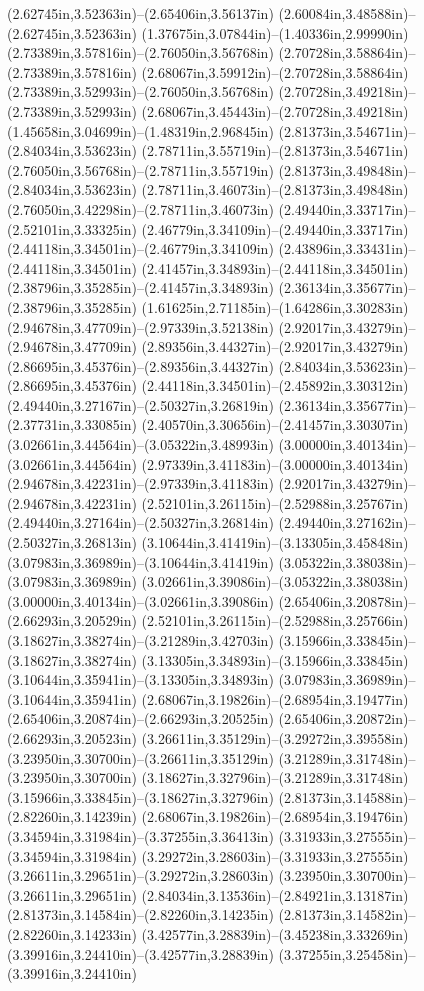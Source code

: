 (2.62745in,3.52363in)--(2.65406in,3.56137in) (2.60084in,3.48588in)--(2.62745in,3.52363in) (1.37675in,3.07844in)--(1.40336in,2.99990in) (2.73389in,3.57816in)--(2.76050in,3.56768in) (2.70728in,3.58864in)--(2.73389in,3.57816in) (2.68067in,3.59912in)--(2.70728in,3.58864in) (2.73389in,3.52993in)--(2.76050in,3.56768in) (2.70728in,3.49218in)--(2.73389in,3.52993in) (2.68067in,3.45443in)--(2.70728in,3.49218in) (1.45658in,3.04699in)--(1.48319in,2.96845in) (2.81373in,3.54671in)--(2.84034in,3.53623in) (2.78711in,3.55719in)--(2.81373in,3.54671in) (2.76050in,3.56768in)--(2.78711in,3.55719in) (2.81373in,3.49848in)--(2.84034in,3.53623in) (2.78711in,3.46073in)--(2.81373in,3.49848in) (2.76050in,3.42298in)--(2.78711in,3.46073in) (2.49440in,3.33717in)--(2.52101in,3.33325in) (2.46779in,3.34109in)--(2.49440in,3.33717in) (2.44118in,3.34501in)--(2.46779in,3.34109in) (2.43896in,3.33431in)--(2.44118in,3.34501in) (2.41457in,3.34893in)--(2.44118in,3.34501in) (2.38796in,3.35285in)--(2.41457in,3.34893in) (2.36134in,3.35677in)--(2.38796in,3.35285in) (1.61625in,2.71185in)--(1.64286in,3.30283in) (2.94678in,3.47709in)--(2.97339in,3.52138in) (2.92017in,3.43279in)--(2.94678in,3.47709in) (2.89356in,3.44327in)--(2.92017in,3.43279in) (2.86695in,3.45376in)--(2.89356in,3.44327in) (2.84034in,3.53623in)--(2.86695in,3.45376in) (2.44118in,3.34501in)--(2.45892in,3.30312in) (2.49440in,3.27167in)--(2.50327in,3.26819in) (2.36134in,3.35677in)--(2.37731in,3.33085in) (2.40570in,3.30656in)--(2.41457in,3.30307in) (3.02661in,3.44564in)--(3.05322in,3.48993in) (3.00000in,3.40134in)--(3.02661in,3.44564in) (2.97339in,3.41183in)--(3.00000in,3.40134in) (2.94678in,3.42231in)--(2.97339in,3.41183in) (2.92017in,3.43279in)--(2.94678in,3.42231in) (2.52101in,3.26115in)--(2.52988in,3.25767in) (2.49440in,3.27164in)--(2.50327in,3.26814in) (2.49440in,3.27162in)--(2.50327in,3.26813in) (3.10644in,3.41419in)--(3.13305in,3.45848in) (3.07983in,3.36989in)--(3.10644in,3.41419in) (3.05322in,3.38038in)--(3.07983in,3.36989in) (3.02661in,3.39086in)--(3.05322in,3.38038in) (3.00000in,3.40134in)--(3.02661in,3.39086in) (2.65406in,3.20878in)--(2.66293in,3.20529in) (2.52101in,3.26115in)--(2.52988in,3.25766in) (3.18627in,3.38274in)--(3.21289in,3.42703in) (3.15966in,3.33845in)--(3.18627in,3.38274in) (3.13305in,3.34893in)--(3.15966in,3.33845in) (3.10644in,3.35941in)--(3.13305in,3.34893in) (3.07983in,3.36989in)--(3.10644in,3.35941in) (2.68067in,3.19826in)--(2.68954in,3.19477in) (2.65406in,3.20874in)--(2.66293in,3.20525in) (2.65406in,3.20872in)--(2.66293in,3.20523in) (3.26611in,3.35129in)--(3.29272in,3.39558in) (3.23950in,3.30700in)--(3.26611in,3.35129in) (3.21289in,3.31748in)--(3.23950in,3.30700in) (3.18627in,3.32796in)--(3.21289in,3.31748in) (3.15966in,3.33845in)--(3.18627in,3.32796in) (2.81373in,3.14588in)--(2.82260in,3.14239in) (2.68067in,3.19826in)--(2.68954in,3.19476in) (3.34594in,3.31984in)--(3.37255in,3.36413in) (3.31933in,3.27555in)--(3.34594in,3.31984in) (3.29272in,3.28603in)--(3.31933in,3.27555in) (3.26611in,3.29651in)--(3.29272in,3.28603in) (3.23950in,3.30700in)--(3.26611in,3.29651in) (2.84034in,3.13536in)--(2.84921in,3.13187in) (2.81373in,3.14584in)--(2.82260in,3.14235in) (2.81373in,3.14582in)--(2.82260in,3.14233in) (3.42577in,3.28839in)--(3.45238in,3.33269in) (3.39916in,3.24410in)--(3.42577in,3.28839in) (3.37255in,3.25458in)--(3.39916in,3.24410in) 